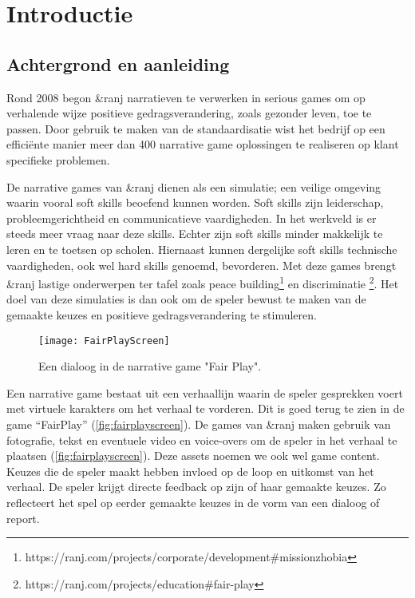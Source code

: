 \chapter{Introductie}
\label{ch:introdcution}

\section{Achtergrond en aanleiding}
Rond 2008 begon \&ranj narratieven te verwerken in serious games om op verhalende wijze positieve gedragsverandering, zoals gezonder leven, toe te passen. Door gebruik te maken van de standaardisatie wist het bedrijf op een efficiënte manier meer dan 400 narrative game oplossingen te realiseren op klant specifieke problemen.

De narrative games van \&ranj dienen als een simulatie; een veilige omgeving waarin vooral soft skills beoefend kunnen worden. Soft skills zijn leiderschap, probleemgerichtheid en communicatieve vaardigheden. In het werkveld is er steeds meer vraag naar deze skills\cite{Gibert2017}\cite{Hirsch2017}\cite{Robles2012}. Echter zijn soft skills minder makkelijk te leren en te toetsen op scholen\cite{BishnuMurti2014}. Hiernaast kunnen dergelijke soft skills technische vaardigheden, ook wel hard skills genoemd, bevorderen\cite{Schulz2008}. Met deze games brengt \&ranj lastige onderwerpen ter tafel zoals peace building\footnote{https://ranj.com/projects/corporate/development\#missionzhobia} en discriminatie \footnote{https://ranj.com/projects/education\#fair-play}. Het doel van deze simulaties is dan ook om de speler bewust te maken van de gemaakte keuzes en positieve gedragsverandering te stimuleren.

\begin{wrapfigure}{r}{0.4\textwidth}
    \texttt{[image: FairPlayScreen]}
    \caption{Een dialoog in de narrative game "Fair Play".}
    \label{fig:fairplayscreen}
    \centering
\end{wrapfigure}

Een narrative game bestaat uit een verhaallijn waarin de speler gesprekken voert met virtuele karakters om het verhaal te vorderen. Dit is goed terug te zien in de game “FairPlay” (\autoref{fig:fairplayscreen}). De games van \&ranj maken gebruik van fotografie, tekst en eventuele video en voice-overs om de speler in het verhaal te plaatsen (\autoref{fig:fairplayscreen}). Deze assets noemen we ook wel game content. Keuzes die de speler maakt hebben invloed op de loop en uitkomst van het verhaal. De speler krijgt directe feedback op zijn of haar gemaakte keuzes. Zo reflecteert het spel op eerder gemaakte keuzes in de vorm van een dialoog of report.

